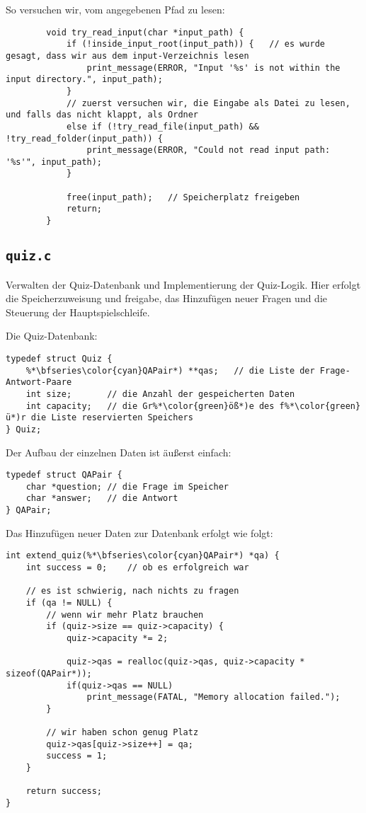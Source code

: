 \documentclass{article}
\begin{document}
\noindent So versuchen wir, vom angegebenen Pfad zu lesen:
\begin{lstlisting}
        void try_read_input(char *input_path) {
            if (!inside_input_root(input_path)) {   // es wurde gesagt, dass wir aus dem input-Verzeichnis lesen
                print_message(ERROR, "Input '%s' is not within the input directory.", input_path);
            }
            // zuerst versuchen wir, die Eingabe als Datei zu lesen, und falls das nicht klappt, als Ordner
            else if (!try_read_file(input_path) && !try_read_folder(input_path)) {
                print_message(ERROR, "Could not read input path: '%s'", input_path);
            }

            free(input_path);   // Speicherplatz freigeben
            return;
        }
\end{lstlisting}

\subsection{\texttt{quiz.c}}
Verwalten der Quiz-Datenbank und Implementierung der Quiz-Logik. Hier erfolgt die Speicherzuweisung und freigabe, das Hinzufügen neuer Fragen und die Steuerung der Hauptspielschleife.

\newpage
\noindent   Die Quiz-Datenbank:
\begin{lstlisting}
typedef struct Quiz {
    %*\bfseries\color{cyan}QAPair*) **qas;   // die Liste der Frage-Antwort-Paare
    int size;       // die Anzahl der gespeicherten Daten
    int capacity;   // die Gr%*\color{green}öß*)e des f%*\color{green}ü*)r die Liste reservierten Speichers
} Quiz;
\end{lstlisting}

\noindent Der Aufbau der einzelnen Daten ist äußerst einfach:
\begin{lstlisting}
typedef struct QAPair {
    char *question; // die Frage im Speicher
    char *answer;   // die Antwort
} QAPair;
\end{lstlisting}

\noindent Das Hinzufügen neuer Daten zur Datenbank erfolgt wie folgt:
\begin{lstlisting}
int extend_quiz(%*\bfseries\color{cyan}QAPair*) *qa) {
    int success = 0;    // ob es erfolgreich war
    
    // es ist schwierig, nach nichts zu fragen
    if (qa != NULL) {
        // wenn wir mehr Platz brauchen
        if (quiz->size == quiz->capacity) {
            quiz->capacity *= 2;
            
            quiz->qas = realloc(quiz->qas, quiz->capacity * sizeof(QAPair*));
            if(quiz->qas == NULL)
                print_message(FATAL, "Memory allocation failed.");
        }

        // wir haben schon genug Platz
        quiz->qas[quiz->size++] = qa;
        success = 1;
    }

    return success;
}
\end{lstlisting}
\end{document}
